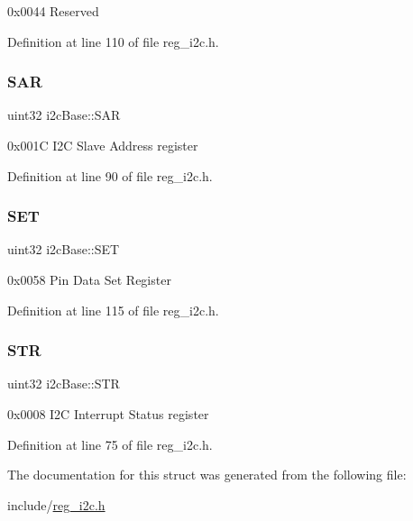0x0044 Reserved 

Definition at line 110 of file reg\+\_\+i2c.\+h.

\mbox{\label{structi2cBase_a1e6c7b3fec813674897b126a5023a8ac}} 
\subsubsection{\texorpdfstring{S\+AR}{SAR}}
{\footnotesize\ttfamily uint32 i2c\+Base\+::\+S\+AR}

0x001C I2C Slave Address register 

Definition at line 90 of file reg\+\_\+i2c.\+h.

\mbox{\label{structi2cBase_a1b041d2289a5b5840384653151f8b64a}} 
\subsubsection{\texorpdfstring{S\+ET}{SET}}
{\footnotesize\ttfamily uint32 i2c\+Base\+::\+S\+ET}

0x0058 Pin Data Set Register 

Definition at line 115 of file reg\+\_\+i2c.\+h.

\mbox{\label{structi2cBase_ad7d4f7dca32da0bdf0fca5f5cf6c2c58}} 
\subsubsection{\texorpdfstring{S\+TR}{STR}}
{\footnotesize\ttfamily uint32 i2c\+Base\+::\+S\+TR}

0x0008 I2C Interrupt Status register 

Definition at line 75 of file reg\+\_\+i2c.\+h.



The documentation for this struct was generated from the following file\+:\begin{DoxyCompactItemize}
\item 
include/\mbox{\hyperlink{reg__i2c_8h}{reg\+\_\+i2c.\+h}}\end{DoxyCompactItemize}
